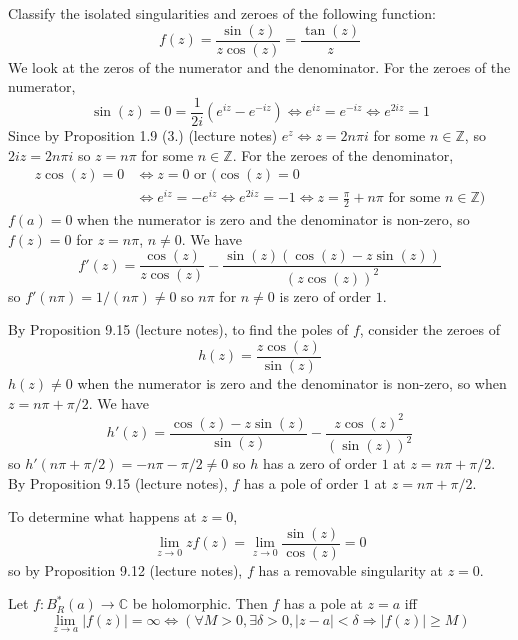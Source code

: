 \begin{example}
	Classify the isolated singularities and zeroes of the following function:
	\[
		f(z) = \frac{\sin(z)}{z \cos(z)} = \frac{\tan(z)}{z}
	\]
	We look at the zeros of the numerator and the denominator. For the zeroes of the numerator,
	\[
		\sin(z) = 0 = \frac{1}{2i} \left( e^{iz} - e^{-iz} \right) \Longleftrightarrow e^{iz} = e^{-iz} \Longleftrightarrow e^{2iz} = 1
	\]
	Since by Proposition 1.9 (3.) (lecture notes) $e^z \Longleftrightarrow z = 2n \pi i$ for some $n \in \mathbb{Z}$, so $2iz = 2n \pi i$ so $z = n \pi$ for some $n \in \mathbb{Z}$. For the zeroes of the denominator,
	\[
		\begin{aligned}
			z \cos(z) = 0 & \Longleftrightarrow z = 0 \text{ or } (\cos(z) = 0 \\
			& \Longleftrightarrow e^{iz} = -e^{iz} \Longleftrightarrow e^{2iz} = -1 \Longleftrightarrow z = \frac{\pi}{2} + n \pi \text{ for some } n \in \mathbb{Z})	
		\end{aligned}
	\]
	$f(a) = 0$ when the numerator is zero and the denominator is non-zero, so $f(z) = 0$ for $z = n \pi$, $n \ne 0$. We have
	\[
		f'(z) = \frac{\cos(z)}{z \cos(z)} - \frac{\sin(z) (\cos(z) - z \sin(z))}{{(z \cos(z))}^2}
	\]
	so $f'(n \pi) = 1 / (n \pi) \ne 0$ so $n \pi$ for $n \ne 0$ is zero of order $1$.
	
	By Proposition 9.15 (lecture notes), to find the poles of $f$, consider the zeroes of
	\[
		h(z) = \frac{z \cos(z)}{\sin(z)}
	\]
	$h(z) \ne 0$ when the numerator is zero and the denominator is non-zero, so when $z = n\pi + \pi / 2$. We have
	\[
		h'(z) = \frac{\cos(z) - z \sin(z)}{\sin(z)} - \frac{z {\cos(z)}^2 }{{(\sin(z))}^2}
	\]
	so $h'(n \pi + \pi / 2) = -n \pi - \pi / 2 \ne 0$ so $h$ has a zero of order $1$ at $z = n \pi + \pi / 2$. By Proposition 9.15 (lecture notes), $f$ has a pole of order $1$ at $z = n \pi + \pi / 2$.

	To determine what happens at $z = 0$,
	\[
		\lim_{z \rightarrow 0} z f(z) = \lim_{z \rightarrow 0} \frac{\sin(z)}{\cos(z)} = 0
	\]
	so by Proposition 9.12 (lecture notes), $f$ has a removable singularity at $z = 0$.
\end{example}

\begin{proposition}
	Let $f: B_R^*(a) \rightarrow \mathbb{C}$ be holomorphic. Then $f$ has a pole at $z = a$ iff
	\[
		\lim_{z \rightarrow a} |f(z)| = \infty \Longleftrightarrow (\forall M > 0, \exists \delta > 0, |z - a| < \delta \Longrightarrow |f(z)| \ge M)
	\]
\end{proposition}

